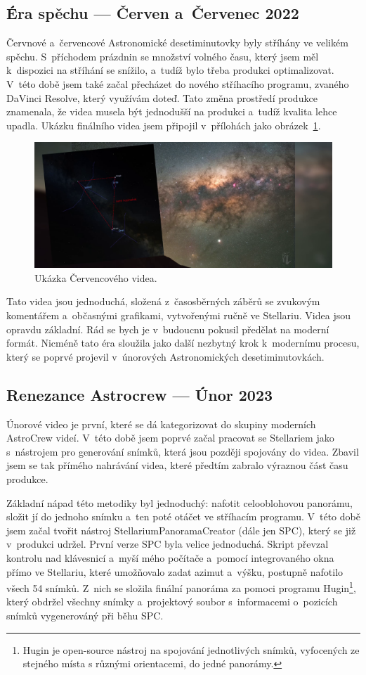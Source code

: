 \documentclass[12pt,a4paper,titlepage]{article}
\begin{document}
\subsection{Éra spěchu --- Červen a~Červenec 2022}
Červnové a~červencové Astronomické desetiminutovky byly stříhány ve velikém spěchu. S~příchodem prázdnin se množství volného času, který jsem měl k~dispozici na stříhání se snížilo, a~tudíž bylo třeba produkci optimalizovat. V~této době jsem také začal přecházet do nového stříhacího programu, zvaného DaVinci Resolve, který využívám doteď. Tato změna prostředí produkce znamenala, že videa musela být jednodušší na produkci a~tudíž kvalita lehce upadla. Ukázku finálního videa jsem připojil v~přílohách jako obrázek~\ref{img:cervenec}.

\begin{figure}[H]
	\centering
	\includegraphics[width=.85\textwidth]{cervenec.png}
	\caption{Ukázka Červencového videa.}\label{img:cervenec}
\end{figure}

Tato videa jsou jednoduchá, složená z~časosběrných záběrů se zvukovým komentářem a~občasnými grafikami, vytvořenými ručně ve Stellariu. Videa jsou opravdu základní. Rád se bych je v~budoucnu pokusil předělat na moderní formát. Nicméně tato éra sloužila jako další nezbytný krok k~modernímu procesu, který se poprvé projevil v~únorových Astronomických desetiminutovkách.
\subsection{Renezance Astrocrew --- Únor 2023}
Únorové video je první, které se dá kategorizovat do skupiny moderních AstroCrew videí. V~této době jsem poprvé začal pracovat se Stellariem jako s~nástrojem pro generování snímků, která jsou později spojovány do videa. Zbavil jsem se tak přímého nahrávání videa, které předtím zabralo výraznou část času produkce.

Základní nápad této metodiky byl jednoduchý: nafotit celooblohovou panorámu, složit jí do jednoho snímku a~ten poté otáčet ve stříhacím programu. V~této době jsem začal tvořit nástroj StellariumPanoramaCreator (dále jen SPC), který se již v~produkci udržel. První verze SPC byla velice jednoduchá. Skript převzal kontrolu nad klávesnicí a~myší mého počítače a~pomocí integrovaného okna přímo ve Stellariu, které umožňovalo zadat azimut a~výšku, postupně nafotilo všech 54 snímků. Z~nich se složila finální panoráma za pomoci programu Hugin\footnote{Hugin je open-source nástroj na spojování jednotlivých snímků, vyfocených ze stejného místa s různými orientacemi, do jedné panorámy. }, který obdržel všechny snímky a~projektový soubor s~informacemi o~pozicích snímků vygenerováný při běhu SPC.\@
\end{document}
